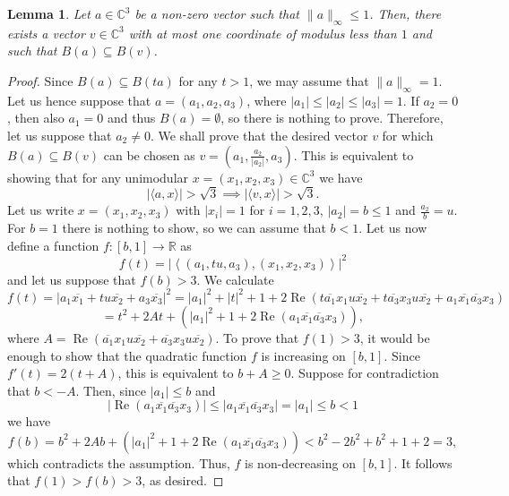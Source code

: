 \documentclass[12pt, a4paper]{article}
\theoremstyle{plain} %
\newtheorem{lemma}[theorem]{Lemma}       %
\theoremstyle{definition} %
\theoremstyle{remark} %
\DeclareMathOperator{\re}{Re}
\begin{document}
\begin{lemma}\label{lem:blob_expansion}
Let $a \in \mathbb{C}^3$ be a non-zero vector such that $\|a\|_{\infty} \leq 1$. Then, there exists a vector $v \in \mathbb{C}^3$ with at most one coordinate of modulus less than $1$ and such that $B(a) \subseteq B(v)$.
\end{lemma}
\begin{proof}



Since $B(a) \subseteq B(ta)$ for any $t>1$, we may assume that $\|a\|_{\infty}=1$. Let us hence suppose that $a = (a_1, a_2, a_3)$, where $|a_1| \leq |a_2| \leq |a_3|=1$. If $a_2=0$, then also $a_1=0$ and thus $B(a) = \emptyset$, so there is nothing to prove. Therefore, let us suppose that $a_2 \neq 0$. We shall prove that the desired vector $v$ for which $B(a) \subseteq B(v)$ can be chosen as $v = \left (a_1, \frac{a_2}{|a_2|}, a_3 \right)$. This is equivalent to showing that for any unimodular $ x = (x_1, x_2, x_3) \in \mathbb{C}^3$ we have
$$|\langle a, x \rangle | > \sqrt{3} \implies |\langle v, x \rangle | > \sqrt{3}.$$
Let us write $x=(x_1, x_2, x_3)$ with $|x_i|=1$ for $i=1, 2 ,3$, $|a_2|=b \leq 1$ and $\frac{a_2}{b}=u$. For $b=1$ there is nothing to show, so we can assume that $b<1$. Let us now define a function $f: [b, 1] \to \mathbb{R}$ as
$$f(t) = \left |\left \langle (a_1, tu, a_3), (x_1, x_2, x_3) \right \rangle \right |^2$$
and let us suppose that $f(b)>3$. We calculate
$$f(t) = \left | a_1 \overline{x_1} + tu \overline{x_2} + a_3 \overline{x_3} \right |^2 = |a_1|^2 + |t|^2 + 1 +2\re \left ( t \overline{a_1}x_1u\overline{x_2} + t\overline{a_3}x_3u\overline{x_2} + a_1\overline{x_1}\overline{a_3}x_3 \right )$$
$$= t^2  + 2At + \left ( |a_1|^2 + 1 + 2\re(a_1\overline{x_1}\overline{a_3}x_3 ) \right ),$$
where $A =\re \left ( \overline{a_1}x_1u\overline{x_2} + \overline{a_3}x_3u\overline{x_2} \right )$. To prove that $f(1)>3$, it would be enough to show that the quadratic function $f$ is increasing on $[b, 1]$. Since $f'(t)=2(t+A)$, this is equivalent to $b + A \geq 0$. Suppose for contradiction that $b < - A$. Then, since $|a_1| \leq b$ and
$$|\re(a_1\overline{x_1}\overline{a_3}x_3 )| \leq |a_1\overline{x_1}\overline{a_3}x_3| = |a_1| \leq b<1$$
we have
$$f(b) = b^2 + 2Ab + \left ( |a_1|^2 + 1 + 2\re(a_1\overline{x_1}\overline{a_3}x_3 ) \right ) < b^2 - 2b^2 + b^2 + 1 + 2 = 3, $$
which contradicts the assumption. Thus, $f$ is non-decreasing on $[b, 1]$. It follows that $f(1)>f(b)>3$, as desired.
\end{proof}
\end{document}
